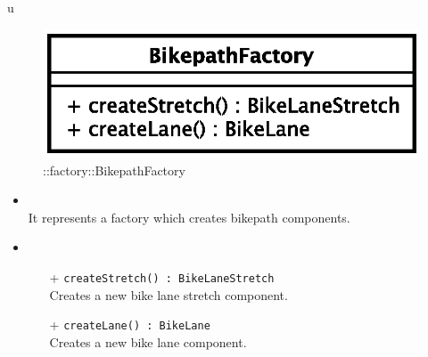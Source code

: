 u
\begin{figure}[h]
\centering
\includegraphics[scale=0.6,keepaspectratio]{images/solution/bikepath_factory.eps}
\caption{\pReactiveFactory::factory::BikepathFactory}
\label{fig:sd-app-bikepath-factory}
\end{figure}
\FloatBarrier
\begin{itemize}
  \item \textbf{\descr} \\
It represents a factory which creates bikepath components.
  \item \textbf{\ops} \\
  \begin{itemize} 
    \item[+] \texttt{createStretch() : BikeLaneStretch} \\
Creates a new bike lane stretch component.
    \item[+] \texttt{createLane() : BikeLane} \\
Creates a new bike lane component.
  \end{itemize}
\end{itemize}
